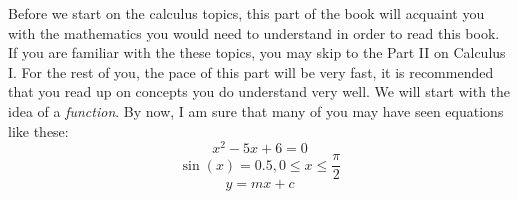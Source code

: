 \quad \quad Before we start on the calculus topics, this part of the book will acquaint you with the mathematics you would need to understand in order to read this book. If you are familiar with the these topics, you may skip to the Part II on Calculus I. For the rest of you, the pace of this part will be very fast, it is recommended that you read up on concepts you do understand very well. We will start with the idea of a \textit{function}. By now, I am sure that many of you may have seen equations like these:
  \begin{equation}
    x^2-5x+6=0
  \end{equation}
  \begin{equation}
    \sin(x)=0.5, 0\leq x \leq\frac{\pi}{2}
  \end{equation}
  \begin{equation}
    \label{line}
    y=mx+c
  \end{equation}

  \begin{marginfigure}
    \centering
    \tiny\caption{Graph of $$y=x$$.}
  \end{marginfigure}

